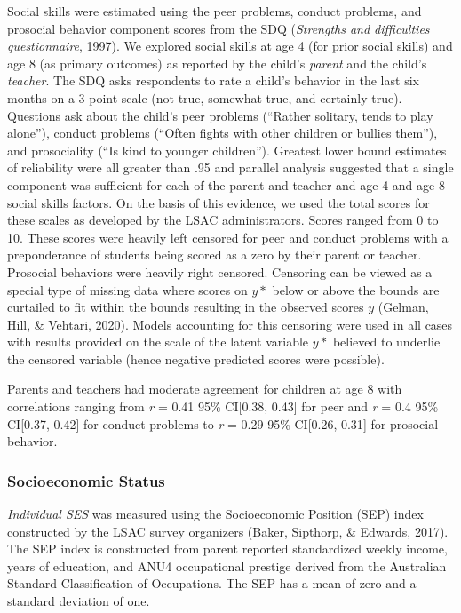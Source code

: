 \documentclass[
  english,
  man]{apa6}
\begin{document}
Social skills were estimated using the peer problems, conduct problems, and prosocial behavior component scores from the SDQ (\emph{Strengths and difficulties questionnaire}, 1997). We explored social skills at age 4 (for prior social skills) and age 8 (as primary outcomes) as reported by the child's \emph{parent} and the child's \emph{teacher}. The SDQ asks respondents to rate a child's behavior in the last six months on a 3-point scale (not true, somewhat true, and certainly true). Questions ask about the child's peer problems (``Rather solitary, tends to play alone''), conduct problems (``Often fights with other children or bullies them''), and prosociality (``Is kind to younger children''). Greatest lower bound estimates of reliability were all greater than .95 and parallel analysis suggested that a single component was sufficient for each of the parent and teacher and age 4 and age 8 social skills factors. On the basis of this evidence, we used the total scores for these scales as developed by the LSAC administrators. Scores ranged from 0 to 10. These scores were heavily left censored for peer and conduct problems with a preponderance of students being scored as a zero by their parent or teacher. Prosocial behaviors were heavily right censored. Censoring can be viewed as a special type of missing data where scores on \(y*\) below or above the bounds are curtailed to fit within the bounds resulting in the observed scores \(y\) (Gelman, Hill, \& Vehtari, 2020). Models accounting for this censoring were used in all cases with results provided on the scale of the latent variable \(y*\) believed to underlie the censored variable (hence negative predicted scores were possible).

Parents and teachers had moderate agreement for children at age 8 with correlations ranging from \emph{r} = 0.41 95\% CI{[}0.38, 0.43{]} for peer and \emph{r} = 0.4 95\% CI{[}0.37, 0.42{]} for conduct problems to \emph{r} = 0.29 95\% CI{[}0.26, 0.31{]} for prosocial behavior.

\hypertarget{socioeconomic-status}{%
\subsubsection{Socioeconomic Status}\label{socioeconomic-status}}

\emph{Individual SES} was measured using the Socioeconomic Position (SEP) index constructed by the LSAC survey organizers (Baker, Sipthorp, \& Edwards, 2017). The SEP index is constructed from parent reported standardized weekly income, years of education, and ANU4 occupational prestige derived from the Australian Standard Classification of Occupations. The SEP has a mean of zero and a standard deviation of one.
\end{document}

